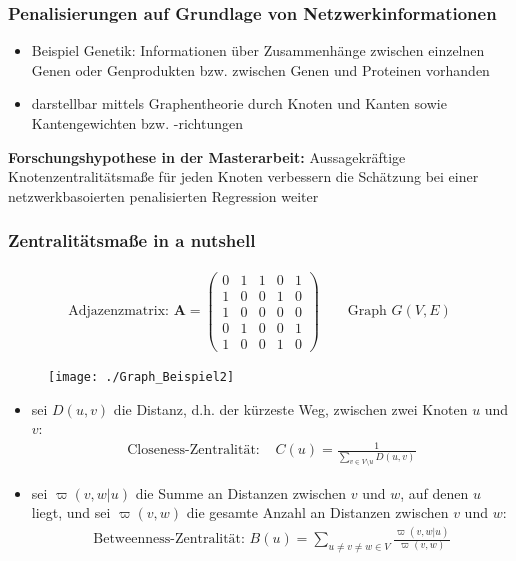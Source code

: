 \documentclass{beamer}
\begin{document}
\begin{frame}
\frametitle{Penalisierungen auf Grundlage von Netzwerkinformationen}
	\begin{itemize}
	\item  Beispiel Genetik: Informationen über Zusammenhänge zwischen einzelnen Genen oder Genprodukten bzw. zwischen Genen und Proteinen vorhanden
	\item darstellbar mittels Graphentheorie durch Knoten und Kanten sowie Kantengewichten bzw. -richtungen
	\end{itemize}
	\textbf{Forschungshypothese in der Masterarbeit:} Aussagekräftige Knotenzentralitätsmaße für jeden Knoten verbessern die Schätzung bei einer netzwerkbasoierten penalisierten Regression weiter
\end{frame}


\begin{frame}
	\frametitle{Zentralitätsmaße {\glqq}in a nutshell{\grqq}}
	\begin{align*}
	\text{Adjazenzmatrix: } \mathbf{A}=\begin{pmatrix}
	0 & 1 & 1 & 0 & 1 \\
	1 & 0 & 0 & 1 & 0 \\
	1 & 0 & 0 & 0 & 0 \\
	0 & 1 & 0 & 0 & 1 \\
	1 & 0 & 0 & 1 & 0
	\end{pmatrix} \qquad \text{Graph }G(V,E)
	\end{align*}
	\begin{figure}
	\centering
	\texttt{[image: ./Graph\_Beispiel2]}
	\label{fig:graphentheorie}
	\end{figure}
\end{frame}


\begin{frame}
	\begin{itemize}
	\item sei $D(u, v)$ die Distanz, d.h. der kürzeste Weg, zwischen zwei Knoten $u$ und $v$: 
	\begin{align*}
	\text{Closeness-Zentralität: } & C(u)=\frac{1}{\sum_{v \in V \setminus u} D(u, v)}
	\end{align*}
	\item sei $\varpi(v,w|u)$ die Summe an Distanzen zwischen $v$ und $w$, auf denen $u$ liegt, und sei $\varpi(v,w)$ die gesamte Anzahl an Distanzen zwischen $v$ und $w$:
	\begin{align*}
		\text{Betweenness-Zentralität: } B(u)=\sum_{u \neq v \neq w \in V} \frac{\varpi(v,w|u)}{\varpi(v,w)}\\
	\end{align*}
	\end{itemize}
\end{frame}
\end{document}
